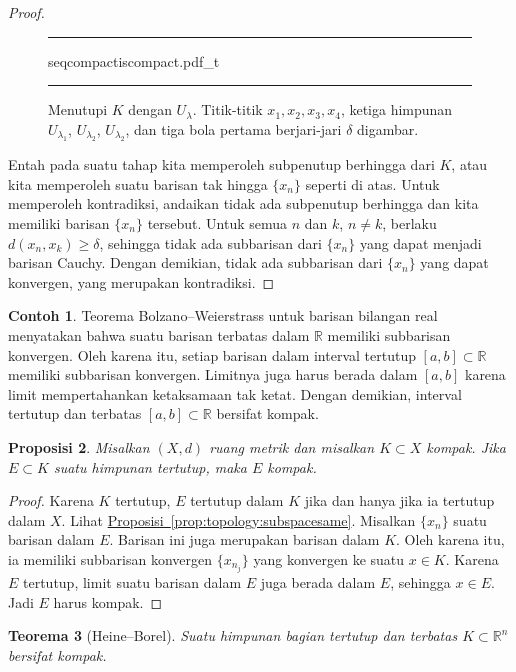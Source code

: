 \documentclass[12pt,openany]{book}
\newcommand{\R}{{\mathbb{R}}}
\theoremstyle{plain}
\newtheorem{thm}{Teorema}[section]
\newtheorem{prop}[thm]{Proposisi}
\theoremstyle{remark}
\theoremstyle{definition}
\newenvironment{myfig}{%
\begin{figure}[h!t]
\noindent\rule{\textwidth}{0.5pt}\vspace{12pt}\par\centering}%
{\par\noindent\rule{\textwidth}{0.5pt}
\end{figure}}
\theoremstyle{exercise}
\theoremstyle{example}
\newtheorem{example}[thm]{Contoh}
\newcommand{\propref}[1]{\hyperref[#1]{Proposisi~\ref*{#1}}}
\begin{document}
\begin{proof}
\begin{myfig}
{seqcompactiscompact.pdf_t}
\caption{Menutupi $K$ dengan $U_{\lambda}$. Titik-titik
$x_1,x_2,x_3,x_4$,
ketiga himpunan
$U_{\lambda_1}$,
$U_{\lambda_2}$,
$U_{\lambda_2}$,
dan
tiga bola pertama
berjari-jari $\delta$ digambar.\label{fig:seqcompactiscompact}}
\end{myfig}

Entah pada suatu tahap kita memperoleh subpenutup berhingga dari $K$,
atau kita memperoleh suatu
barisan tak hingga
$\{ x_n \}$ seperti di atas.
Untuk memperoleh kontradiksi, andaikan
tidak ada subpenutup berhingga dan kita memiliki barisan $\{ x_n \}$ tersebut.
Untuk semua $n$ dan $k$, $n \neq k$,
berlaku $d(x_n,x_k) \geq \delta$,
sehingga tidak ada subbarisan dari $\{ x_n \}$ yang dapat menjadi
barisan Cauchy. Dengan demikian, tidak ada subbarisan dari $\{ x_n \}$ yang dapat konvergen,
yang merupakan kontradiksi.
\end{proof}

\begin{example}
Teorema Bolzano--Weierstrass untuk barisan bilangan real
menyatakan bahwa suatu barisan terbatas dalam $\R$ memiliki subbarisan
konvergen. Oleh karena itu, setiap barisan dalam interval tertutup $[a,b] \subset \R$ memiliki
subbarisan konvergen. Limitnya juga harus berada dalam $[a,b]$ karena limit
mempertahankan ketaksamaan tak ketat. Dengan demikian, interval tertutup dan terbatas $[a,b]
\subset \R$ bersifat kompak.
\end{example}

\begin{prop}
Misalkan $(X,d)$ ruang metrik dan misalkan $K \subset X$ kompak. Jika
$E \subset K$ suatu himpunan tertutup, maka $E$ kompak.
\end{prop}

\begin{proof}
Karena $K$ tertutup, $E$ tertutup dalam $K$ jika
dan hanya jika ia tertutup dalam $X$.
Lihat \propref{prop:topology:subspacesame}.
Misalkan $\{ x_n \}$ suatu barisan dalam $E$. Barisan ini juga merupakan barisan dalam $K$.
Oleh karena itu, ia memiliki subbarisan konvergen $\{ x_{n_j} \}$ yang konvergen ke
suatu $x \in K$. Karena $E$ tertutup, limit suatu barisan dalam $E$ juga berada dalam $E$,
sehingga $x \in E$. Jadi $E$ harus kompak.
\end{proof}

\begin{thm}[Heine--Borel] 
\label{thm:msbw}
Suatu himpunan bagian tertutup dan terbatas $K \subset \R^n$ bersifat kompak.
\end{thm}
\end{document}
